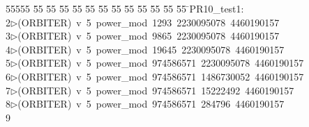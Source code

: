 %
%
\begin{tabbing}
55555 \= 55 \= 55 \= 55 \= 55 \= 55 \= 55 \= 55 \= 55 \= 55 \= 55 \= 55 \= 55 \= \>PR10\_test1:\\[0pt]
2\>$\triangleright$\>(ORBITER)\ v\ 5\ power\_mod\ 1293\ 2230095078\ 4460190157\\[0pt]
3\>$\triangleright$\>(ORBITER)\ v\ 5\ power\_mod\ 9865\ 2230095078\ 4460190157\\[0pt]
4\>$\triangleright$\>(ORBITER)\ v\ 5\ power\_mod\ 19645\ 2230095078\ 4460190157\\[0pt]
5\>$\triangleright$\>(ORBITER)\ v\ 5\ power\_mod\ 974586571\ 2230095078\ 4460190157\\[0pt]
6\>$\triangleright$\>(ORBITER)\ v\ 5\ power\_mod\ 974586571\ 1486730052\ 4460190157\\[0pt]
7\>$\triangleright$\>(ORBITER)\ v\ 5\ power\_mod\ 974586571\ 15222492\ 4460190157\\[0pt]
8\>$\triangleright$\>(ORBITER)\ v\ 5\ power\_mod\ 974586571\ 284796\ 4460190157\\[0pt]
9\>\end{tabbing}
